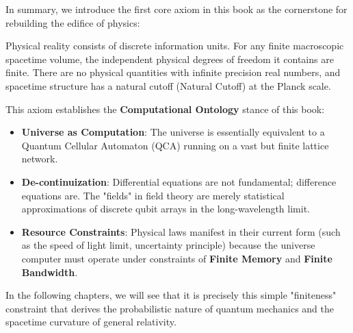 In summary, we introduce the first core axiom in this book as the cornerstone for rebuilding the edifice of physics:

\begin{axiom}
Physical reality consists of discrete information units. For any finite macroscopic spacetime volume, the independent physical degrees of freedom it contains are finite. There are no physical quantities with infinite precision real numbers, and spacetime structure has a natural cutoff (Natural Cutoff) at the Planck scale.
\end{axiom}

This axiom establishes the \textbf{Computational Ontology} stance of this book:

\begin{itemize}
\item \textbf{Universe as Computation}: The universe is essentially equivalent to a Quantum Cellular Automaton (QCA) running on a vast but finite lattice network.

\item \textbf{De-continuization}: Differential equations are not fundamental; difference equations are. The "fields" in field theory are merely statistical approximations of discrete qubit arrays in the long-wavelength limit.

\item \textbf{Resource Constraints}: Physical laws manifest in their current form (such as the speed of light limit, uncertainty principle) because the universe computer must operate under constraints of \textbf{Finite Memory} and \textbf{Finite Bandwidth}.
\end{itemize}

In the following chapters, we will see that it is precisely this simple "finiteness" constraint that derives the probabilistic nature of quantum mechanics and the spacetime curvature of general relativity.
